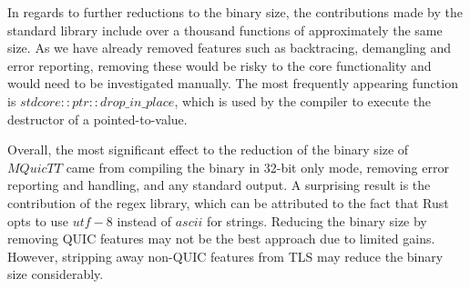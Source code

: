 In regards to further reductions to the binary size, the contributions made by the standard library include over a thousand functions of approximately the same size.
As we have already removed features such as backtracing, demangling and error reporting, removing these would be risky to the core functionality and would need to be investigated manually.
The most frequently appearing function is $std core::ptr::drop\_in\_place$, which is used by the compiler to execute the destructor of a pointed-to-value.

Overall, the most significant effect to the reduction of the binary size of $MQuicTT$ came from compiling the binary in 32-bit only mode, removing error reporting and handling, and any standard output.
A surprising result is the contribution of the regex library, which can be attributed to the fact that Rust opts to use $utf-8$ instead of $ascii$ for strings.
Reducing the binary size by removing QUIC features may not be the best approach due to limited gains.
However, stripping away non-QUIC features from TLS may reduce the binary size considerably.
